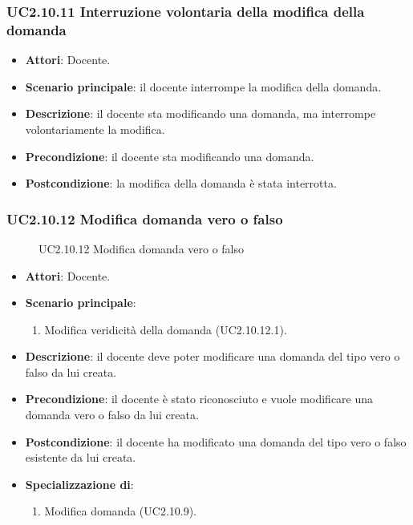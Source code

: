 \subsubsection{UC2.10.11 Interruzione volontaria della modifica della domanda}
\begin{itemize}
\item \textbf{Attori}: Docente.
\item \textbf{Scenario principale}: il docente interrompe la modifica della domanda.
\item \textbf{Descrizione}: il docente sta modificando una domanda, ma interrompe volontariamente la modifica.
\item \textbf{Precondizione}: il docente sta modificando una domanda.
\item \textbf{Postcondizione}: la modifica della domanda è stata interrotta.
\end{itemize}
\subsubsection{UC2.10.12 Modifica domanda vero o falso}
\begin{figure}[H]
\centering
\noindent{}
\caption{UC2.10.12 Modifica domanda vero o falso}
\end{figure}
\begin{itemize}
\item \textbf{Attori}: Docente.
\item \textbf{Scenario principale}:
\begin{enumerate}
\item Modifica veridicità della domanda (UC2.10.12.1).
\end{enumerate}
\item \textbf{Descrizione}: il docente deve poter modificare una domanda del tipo vero o falso da lui creata.
\item \textbf{Precondizione}: il docente è stato riconosciuto e vuole modificare una domanda vero o falso da lui creata.
\item \textbf{Postcondizione}: il docente ha modificato una domanda del tipo vero o falso esistente da lui creata.
\item \textbf{Specializzazione di}:
\begin{enumerate}
\item Modifica domanda (UC2.10.9).
\end{enumerate}
\end{itemize}
